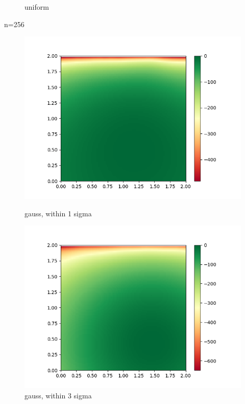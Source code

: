 \documentclass[english]{scrartcl}
\begin{document}
\begin{figure}[H]
	\caption{uniform} 
	\endminipage \hfill
\end{figure}

\par n=256
\begin{figure}[H]
	\includegraphics[width=\linewidth]{lighthouse/2d/gauss_1sigma_n=256}
	\caption{gauss, within 1 sigma}  
	\endminipage \hfill
	\includegraphics[width=\linewidth]{lighthouse/2d/gauss_3sigma_n=256}
	\caption{gauss, within 3 sigma} 
	\endminipage \hfill

\end{figure}
\end{document}
